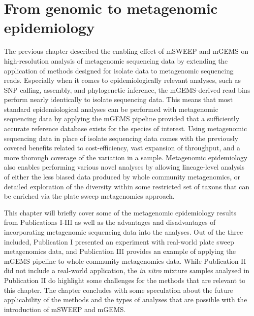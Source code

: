 \documentclass[officiallayout]{tktla}
\begin{document}
\section{From genomic to metagenomic epidemiology}

The previous chapter described the enabling effect of mSWEEP and mGEMS
on high-resolution analysis of metagenomic sequencing data by
extending the application of methods designed for isolate data to
metagenomic sequencing reads. Especially when it comes to
epidemiologically relevant analyses, such as SNP calling, assembly,
and phylogenetic inference, the mGEMS-derived read bins perform nearly
identically to isolate sequencing data. This means that most standard
epidemiological analyses can be performed with metagenomic sequencing
data by applying the mGEMS pipeline \textemdash{ } provided that a
sufficiently accurate reference database exists for the species of
interest. Using metagenomic sequencing data in place of isolate
sequencing data comes with the previously covered benefits related to
cost-efficiency, vast expansion of throughput, and a more thorough
coverage of the variation in a sample. Metagenomic epidemiology also
enables performing various novel analyses by allowing lineage-level
analysis of either the less biased data produced by whole community metagenomics,
or detailed exploration of the diversity within some restricted set of
taxons that can be enriched via the plate sweep metagenomics approach.

This chapter will briefly cover some of the metagenomic epidemiology
results from Publications I-III as well as the advantages and
disadvantages of incorporating metagenomic sequencing data into the
analyses. Out of the three included, Publication I presented an
experiment with real-world plate sweep metagenomics data, and
Publication III provides an example of applying the mGEMS pipeline to
whole community metagenomics data. While Publication II did not include a
real-world application, the \textit{in vitro} mixture samples analysed
in Publication II do highlight some challenges for the methods that are
relevant to this chapter. The chapter concludes with some speculation
about the future applicability of the methods and the types of
analyses that are possible with the introduction of mSWEEP and mGEMS.
\end{document}
